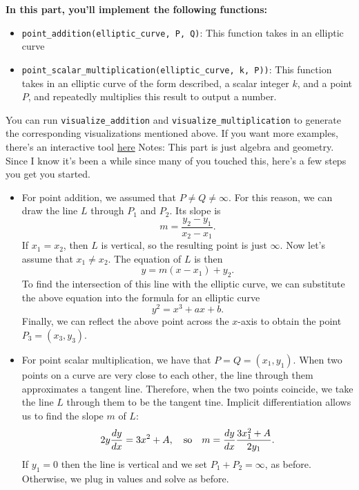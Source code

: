 \documentclass{article}
\begin{document}
\begin{tcolorbox}[enhanced,interior style={top color=Plum!20,bottom color=Plum!30}]
    \textbf{In this part, you'll implement the following functions:}
    \begin{itemize}
        \item \lstinline{point_addition(elliptic_curve, P, Q)}: This function takes in an elliptic curve 
        \item \lstinline{point_scalar_multiplication(elliptic_curve, k, P))}: This function takes in an elliptic curve of the form described, a scalar integer $k$, and a point $P$, and repeatedly multiplies this result to output a number.
    \end{itemize}
    You can run \lstinline{visualize_addition} and \lstinline{visualize_multiplication} to generate the corresponding visualizations mentioned above. If you want more examples, there's an interactive tool \href{https://andrea.corbellini.name/ecc/interactive/reals-add.html}{here}
    Notes: This part is just algebra and geometry. Since I know it's been a while since many of you touched this, here's a few steps you get you started.
    \begin{itemize}
        \item For point addition, we assumed that $P \ne Q \ne \infty$. For this reason, we can draw the line $L$ through $P_{1}$ and $P_{2}$. Its slope is $$m = \frac{y_{2} - y_{1}}{x_{2} - x_{1}}.$$ If $x_{1} = x_{2}$, then $L$ is vertical, so the resulting point is just $\infty$. Now let's assume that $x_{1} \ne x_{2}$. The equation of $L$ is then $$y = m(x - x_{1}) + y_{2}.$$ To find the intersection of this line with the elliptic curve, we can substitute the above equation into the formula for an elliptic curve $$y^{2} = x^{3} + ax + b.$$ Finally, we can reflect the above point across the $x$-axis to obtain the point $P_{3} = (x_{3}, y_{3})$.
        \item For point scalar multiplication, we have that $P = Q = (x_{1}, y_{1})$. When two points on a curve are very close to each other, the line through them approximates a tangent line. Therefore, when the two points coincide, we take the line $L$ through them to be the tangent tine. Implicit differentiation allows us to find the slope $m$ of $L$: $$2y \frac{dy}{dx} = 3x^{2} + A,\text{\quad so\quad} m = \frac{dy}{dx}\frac{3x_{1}^{2} + A}{2y_{1}}.$$ If $y_{1} = 0$ then the line is vertical and we set $P_{1} + P_{2} = \infty$, as before. Otherwise, we plug in values and solve as before.
    \end{itemize}
    
\end{tcolorbox}
\end{document}

